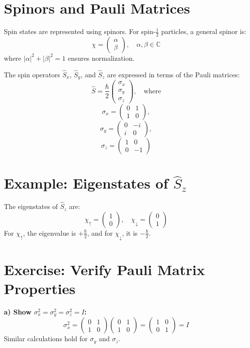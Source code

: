 \documentclass[a4paper,12pt]{article}
\begin{document}
\begin{multicols}{2}
\section*{Spinors and Pauli Matrices}
Spin states are represented using spinors. For spin-$\frac{1}{2}$ particles, a general spinor is:
\[
\chi = \begin{pmatrix}
\alpha \\ \beta
\end{pmatrix}, \quad \alpha, \beta \in \mathbb{C}
\]
where $|\alpha|^2 + |\beta|^2 = 1$ ensures normalization.

The spin operators $\hat{S}_x$, $\hat{S}_y$, and $\hat{S}_z$ are expressed in terms of the Pauli matrices:
\[
\hat{S} = \frac{\hbar}{2} \begin{pmatrix}
\sigma_x \\ \sigma_y \\ \sigma_z
\end{pmatrix}, \quad \text{where}
\]
\[
\sigma_x = \begin{pmatrix}
0 & 1 \\ 1 & 0
\end{pmatrix},
\]
\[
\sigma_y = \begin{pmatrix}
0 & -i \\ i & 0
\end{pmatrix},
\]
\[
\sigma_z = \begin{pmatrix}
1 & 0 \\ 0 & -1
\end{pmatrix}
\]

\section*{Example: Eigenstates of $\hat{S}_z$}
The eigenstates of $\hat{S}_z$ are:
\[
\chi_\uparrow = \begin{pmatrix} 1 \\ 0 \end{pmatrix}, \quad
\chi_\downarrow = \begin{pmatrix} 0 \\ 1 \end{pmatrix}
\]
For $\chi_\uparrow$, the eigenvalue is $+\frac{\hbar}{2}$, and for $\chi_\downarrow$, it is $-\frac{\hbar}{2}$.

\section*{Exercise: Verify Pauli Matrix Properties}
\textbf{a) Show $\sigma_x^2 = \sigma_y^2 = \sigma_z^2 = I$:}
\[
\sigma_x^2 = \begin{pmatrix} 0 & 1 \\ 1 & 0 \end{pmatrix} \begin{pmatrix} 0 & 1 \\ 1 & 0 \end{pmatrix} = \begin{pmatrix} 1 & 0 \\ 0 & 1 \end{pmatrix} = I
\]
Similar calculations hold for $\sigma_y$ and $\sigma_z$.


\end{multicols}
\end{document}
